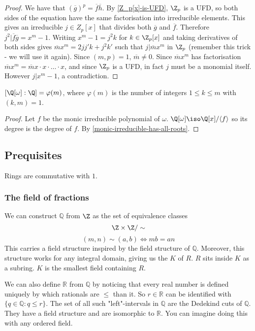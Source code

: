 \begin{proof}
We have that $(\overline{g})^p=\overline{f}\overline{h}$. By \cref{Z_p[x]-is-UFD}, $\Z_p$ is a UFD, so both sides of the equation have the same factorisation into irreducible elements. This gives an irreducible $j\in Z_p[x]$ that divides both $\overline{g}$ and $\overline{f}$. Therefore $j^2|\overline{f}\overline{g}=x^m-1$. Writing $x^m-1=j^2k$ for $k\in \Z_p[x]$ and taking derivatives of both sides gives $\overline{m}x^m=2jj'k+j^2k'$ such that $j|\overline{m}x^m$ in $\Z_p$ (remember this trick - we will use it again). Since $(m,p)=1$, $\overline{m}\neq 0$. Since $\overline{m}x^m$ has factorisation $\overline{m}x^m=\overline{m}x\cdot x\cdot \dots \cdot x$, and since $\Z_p$ is a UFD, in fact $j$ must be a monomial itself. However $j|x^m-1$, a contradiction.
\end{proof}

\begin{corollary}\label{Q[w]-degree}
$[\Q[\omega]:\Q]=\varphi(m)$, where $\varphi(m)$ is the number of integers $1\leq k\leq m$ with $(k,m)=1$.
\end{corollary}

\begin{proof} Let $f$ be the monic irreducible polynomial of $\omega$. $\Q[\omega]\iso \Q[x]/\langle f \rangle$ so its degree is the degree of $f$. By \cref{monic-irreducible-has-all-roots}.
\end{proof}

\subsection{Prequisites}
Rings are commutative with $1$.
\subsubsection{The field of fractions}
We can construct $\mathbb{Q}$ from $\Z$ as the set of equivalence classes $$\Z\times\Z / \sim $$
$$(m,n)\sim (a,b)\iff mb=an$$
This carries a field structure inspired by the field structure of $\mathbb{Q}$. Moreover, this structure works for any integral domain, giving us the  $K$ of $R$. $R$ sits inside $K$ as a subring. $K$ is the smallest field containing $R$.

We can also define $\mathbb{R}$ from $\mathbb{Q}$ by noticing that every real number is defined uniquely by which rationals are $\leq$ than it. So $r\in \mathbb{R}$ can be identified with $\{q\in \mathbb{Q}:q\leq r\}$. The set of all such "left"-intervals in $\mathbb{Q}$ are the Dedekind cuts of $\mathbb{Q}$. They have a field structure and are isomorphic to $\mathbb{R}$. You can imagine doing this with any ordered field.

